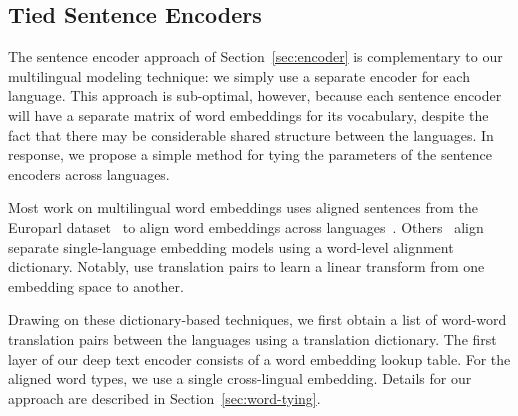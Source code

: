  


\subsection{Tied Sentence Encoders \label{sec:tie-words}}
The sentence encoder approach of Section~\ref{sec:encoder} is complementary to our multilingual modeling technique: we simply use a separate encoder for each language.  This approach is sub-optimal, however, because each sentence encoder will have a separate matrix of word embeddings for its vocabulary, despite the fact that there may be considerable shared structure between the languages. In response, we propose a simple method for tying the parameters of the sentence encoders across languages. 

Most work on multilingual word embeddings uses aligned sentences from the Europarl dataset~\citep{koehn2005europarl} to align word embeddings across languages~\citep{Gouws2015,luong2015bilingual,hermann2014multilingual}. Others~\citep{mikolov2013,faruqui2014retrofitting} align separate single-language embedding models using a word-level alignment dictionary. Notably, \cite{mikolov2013} use translation pairs to learn a linear transform from one embedding space to another. 

Drawing on these dictionary-based techniques, we first obtain a list of word-word translation pairs between the languages using a translation dictionary. The first layer of our deep text encoder consists of a word embedding lookup table. For the aligned word types, we use a single cross-lingual embedding. Details for our approach are described in Section~\ref{sec:word-tying}.

